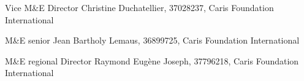 


\begin{cvhonors}


    

\cvhonor
{Vice M\&E Director} %
{Christine Duchatellier, 37028237, Caris Foundation International} %
{} %
{} %


\cvhonor
{M\&E senior} %
{Jean Bartholy Lemaus, 36899725, Caris Foundation International} %
{} %
{} %


\cvhonor
{M\&E regional Director} %
{Raymond Eugène Joseph, 37796218, Caris Foundation International} %
{} %
{} %


\end{cvhonors}